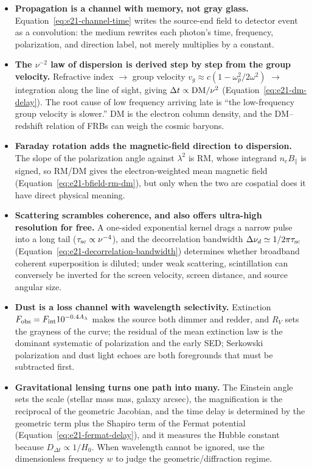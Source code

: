 \begin{itemize}
\item \textbf{Propagation is a channel with memory, not gray glass.} Equation~\eqref{eq:e21-channel-time} writes the source-end field to detector event as a convolution: the medium rewrites each photon's time, frequency, polarization, and direction label, not merely multiplies by a constant.
\item \textbf{The \(\nu^{-2}\) law of dispersion is derived step by step from the group velocity.} Refractive index \(\to\) group velocity \(v_g\approx c(1-\omega_p^2/2\omega^2)\) \(\to\) integration along the line of sight, giving \(\Delta t\propto{\rm DM}/\nu^2\) (Equation~\eqref{eq:e21-dm-delay}). The root cause of low frequency arriving late is ``the low-frequency group velocity is slower.'' DM is the electron column density, and the DM--redshift relation of FRBs can weigh the cosmic baryons.
\item \textbf{Faraday rotation adds the magnetic-field direction to dispersion.} The slope of the polarization angle against \(\lambda^2\) is RM, whose integrand \(n_e B_\parallel\) is signed, so RM/DM gives the electron-weighted mean magnetic field (Equation~\eqref{eq:e21-bfield-rm-dm}), but only when the two are cospatial does it have direct physical meaning.
\item \textbf{Scattering scrambles coherence, and also offers ultra-high resolution for free.} A one-sided exponential kernel drags a narrow pulse into a long tail (\(\tau_{\rm sc}\propto\nu^{-4}\)), and the decorrelation bandwidth \(\Delta\nu_d\simeq1/2\pi\tau_{\rm sc}\) (Equation~\eqref{eq:e21-decorrelation-bandwidth}) determines whether broadband coherent superposition is diluted; under weak scattering, scintillation can conversely be inverted for the screen velocity, screen distance, and source angular size.
\item \textbf{Dust is a loss channel with wavelength selectivity.} Extinction \(F_{\rm obs}=F_{\rm int}10^{-0.4A_\lambda}\) makes the source both dimmer and redder, and \(R_V\) sets the grayness of the curve; the residual of the mean extinction law is the dominant systematic of polarization and the early SED; Serkowski polarization and dust light echoes are both foregrounds that must be subtracted first.
\item \textbf{Gravitational lensing turns one path into many.} The Einstein angle sets the scale (stellar mass mas, galaxy arcsec), the magnification is the reciprocal of the geometric Jacobian, and the time delay is determined by the geometric term plus the Shapiro term of the Fermat potential (Equation~\eqref{eq:e21-fermat-delay}), and it measures the Hubble constant because \(D_{\Delta t}\propto1/H_0\). When wavelength cannot be ignored, use the dimensionless frequency \(w\) to judge the geometric/diffraction regime.

\end{itemize}
